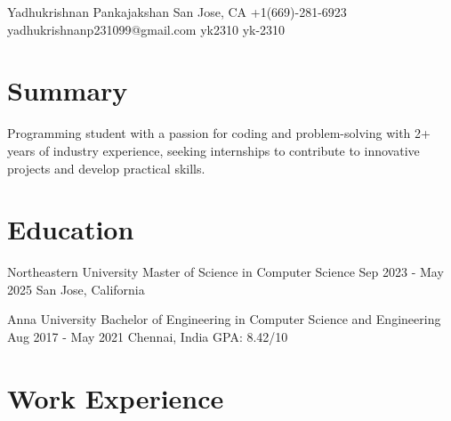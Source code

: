 \documentclass[letterpaper]{resume_config}
\begin{document}
\Header
    {Yadhukrishnan Pankajakshan} %
    {San Jose, CA} %
    {+1(669)-281-6923} %
    {yadhukrishnanp231099@gmail.com} %
    {yk2310} %
    {yk-2310}

\section{Summary}
{
    Programming student with a passion for coding and problem-solving with 2+ years of industry experience, seeking internships to contribute to innovative projects and develop practical skills.
}

\section{Education}

\EducationExperience
    {Northeastern University} %
    {Master of Science in Computer Science} %
    {Sep 2023 - May 2025} %
    {San Jose, California} %
    {}

\EducationExperience
    {Anna University} %
    {Bachelor of Engineering in Computer Science and Engineering} %
    {Aug 2017 - May 2021} %
    {Chennai, India} %
    {GPA: 8.42/10}
\vspace{-7pt}


\section{Work Experience}
\end{document}
